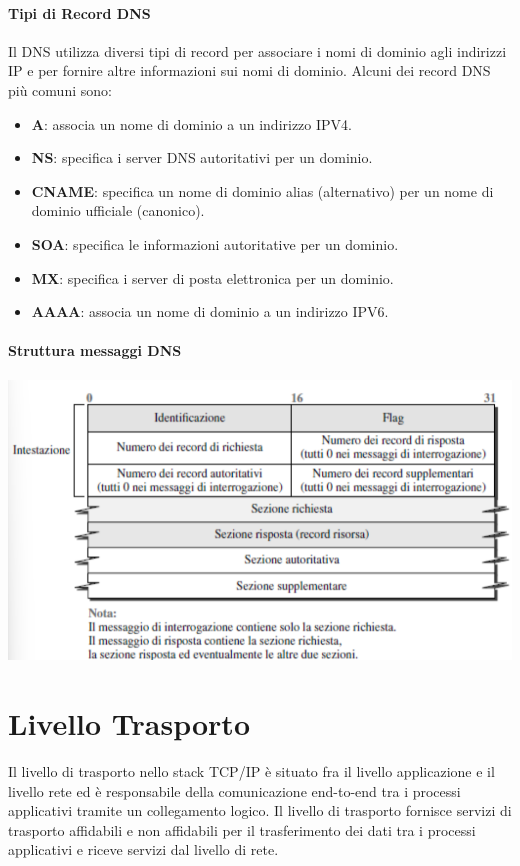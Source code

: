 \documentclass[12pt]{report}
\begin{document}
	\subsubsection{Tipi di Record DNS}
	Il DNS utilizza diversi tipi di record per associare i nomi di dominio agli indirizzi IP e per fornire altre informazioni sui nomi di dominio. Alcuni dei record DNS più comuni sono:
	\begin{itemize}
		\item \textbf{A}: associa un nome di dominio a un indirizzo IPV4.
		\item \textbf{NS}: specifica i server DNS autoritativi per un dominio.
		\item \textbf{CNAME}: specifica un nome di dominio alias (alternativo) per un nome di dominio ufficiale (canonico).
		\item \textbf{SOA}: specifica le informazioni autoritative per un dominio.
		\item \textbf{MX}: specifica i server di posta elettronica per un dominio.
		\item \textbf{AAAA}: associa un nome di dominio a un indirizzo IPV6.
	\end{itemize}

	\subsubsection{Struttura messaggi DNS}
	\begin{center}
		\includegraphics[scale=0.5]{assets/dns-msg.png}
	\end{center}

	\chapter{Livello Trasporto}
	Il livello di trasporto nello stack TCP/IP è situato fra il livello applicazione e il livello rete ed è responsabile della comunicazione end-to-end tra i processi applicativi tramite un collegamento logico. Il livello di trasporto fornisce servizi di trasporto affidabili e non affidabili per il trasferimento dei dati tra i processi applicativi e riceve servizi dal livello di rete. 
	
\end{document}
